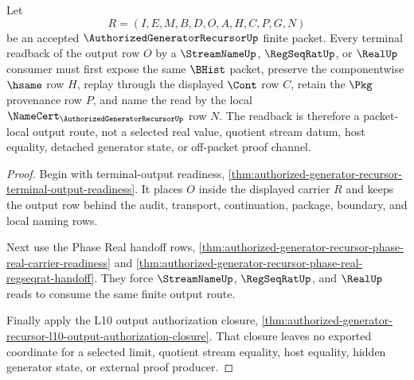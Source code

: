 \begin{theorem}
\label{thm:authorized-generator-recursor-terminal-output-readback}
Let
$$
R=(I,E,M,B,D,O,A,H,C,P,G,N)
$$
be an accepted $\AuthorizedGeneratorRecursorUp$ finite packet. Every terminal
readback of the output row $O$ by a $\StreamNameUp$, $\RegSeqRatUp$, or
$\RealUp$ consumer must first expose the same $\BHist$ packet, preserve the
componentwise $\hsame$ row $H$, replay through the displayed $\Cont$ row $C$,
retain the $\Pkg$ provenance row $P$, and name the read by the local
$\NameCert_{\AuthorizedGeneratorRecursorUp}$ row $N$. The readback is
therefore a packet-local output route, not a selected real value, quotient
stream datum, host equality, detached generator state, or off-packet proof
channel.
\end{theorem}
\begin{proof}
Begin with terminal-output readiness,
\autoref{thm:authorized-generator-recursor-terminal-output-readiness}. It
places $O$ inside the displayed carrier $R$ and keeps the output row behind the
audit, transport, continuation, package, boundary, and local naming rows.

Next use the Phase Real handoff rows,
\autoref{thm:authorized-generator-recursor-phase-real-carrier-readiness} and
\autoref{thm:authorized-generator-recursor-phase-real-regseqrat-handoff}. They
force $\StreamNameUp$, $\RegSeqRatUp$, and $\RealUp$ reads to consume the same
finite output route.

Finally apply the L10 output authorization closure,
\autoref{thm:authorized-generator-recursor-l10-output-authorization-closure}.
That closure leaves no exported coordinate for a selected limit, quotient
stream equality, host equality, hidden generator state, or external proof
producer.
\end{proof}

